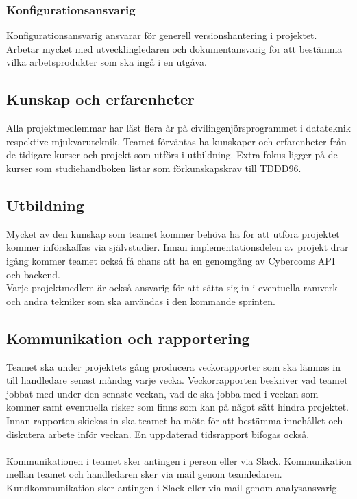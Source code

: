 \subsubsection*{Konfigurationsansvarig}
Konfigurationsansvarig ansvarar för generell versionshantering i projektet. Arbetar mycket med utvecklingledaren och dokumentansvarig för att bestämma vilka arbetsprodukter som ska ingå i en utgåva.


\subsection{Kunskap och erfarenheter}
Alla projektmedlemmar har läst flera år på civilingenjörsprogrammet i datateknik respektive mjukvaruteknik. Teamet förväntas ha kunskaper och erfarenheter från de tidigare kurser och projekt som utförs i utbildning. Extra fokus ligger på de kurser som studiehandboken listar som förkunskapskrav till TDDD96\cite{bib-tddd96}.


\subsection{Utbildning}
Mycket av den kunskap som teamet kommer behöva ha för att utföra projektet kommer införskaffas via självstudier. Innan implementationsdelen av projekt drar igång kommer teamet också få chans att ha en genomgång av Cybercoms API och backend.
\\
Varje projektmedlem är också ansvarig för att sätta sig in i eventuella ramverk och andra tekniker som ska användas i den kommande sprinten.

\subsection{Kommunikation och rapportering}
Teamet ska under projektets gång producera veckorapporter som ska lämnas in till handledare senast måndag varje vecka. Veckorrapporten beskriver vad teamet jobbat med under den senaste veckan, vad de ska jobba med i veckan som kommer samt eventuella risker som finns som kan på något sätt hindra projektet. Innan rapporten skickas in ska teamet ha möte för att bestämma innehållet och diskutera arbete inför veckan. En uppdaterad tidsrapport bifogas också.\\
\\
Kommunikationen i teamet sker antingen i person eller via Slack. Kommunikation mellan teamet och handledaren sker via mail genom teamledaren. Kundkommunikation sker antingen i Slack eller via mail genom analysansvarig.

\pagebreak
